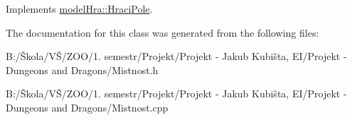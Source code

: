 Implements \hyperlink{classmodel_hra_1_1_hraci_pole_a5a5ef6ed997c5235b6ebb5e0c7ef9396}{model\-Hra\-::\-Hraci\-Pole}.



The documentation for this class was generated from the following files\-:\begin{DoxyCompactItemize}
\item 
B\-:/Škola/\-VŠ/\-Z\-O\-O/1. semestr/\-Projekt/\-Projekt -\/ Jakub Kubišta, E\-I/\-Projekt -\/ Dungeons and Dragons/Mistnost.\-h\item 
B\-:/Škola/\-VŠ/\-Z\-O\-O/1. semestr/\-Projekt/\-Projekt -\/ Jakub Kubišta, E\-I/\-Projekt -\/ Dungeons and Dragons/Mistnost.\-cpp\end{DoxyCompactItemize}
